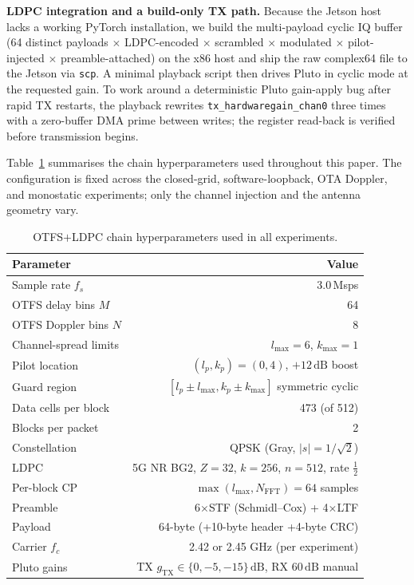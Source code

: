 \documentclass[conference,10pt]{IEEEtran}
\newcommand{\kmax}{k_{\max}}
\newcommand{\lmax}{l_{\max}}
\newcommand{\dB}{\ensuremath{\,\mathrm{dB}}}
\begin{document}
\textbf{LDPC integration and a build-only TX path.} Because the Jetson host lacks a working PyTorch installation, we build the multi-payload cyclic IQ buffer (64 distinct payloads $\times$ LDPC-encoded $\times$ scrambled $\times$ modulated $\times$ pilot-injected $\times$ preamble-attached) on the x86 host and ship the raw complex64 file to the Jetson via \texttt{scp}. A minimal playback script then drives Pluto in cyclic mode at the requested gain. To work around a deterministic Pluto gain-apply bug after rapid TX restarts, the playback rewrites \texttt{tx\_hardwaregain\_chan0} three times with a zero-buffer DMA prime between writes; the register read-back is verified before transmission begins.

Table~\ref{tab:hyperparams} summarises the chain hyperparameters used throughout this paper. The configuration is fixed across the closed-grid, software-loopback, OTA Doppler, and monostatic experiments; only the channel injection and the antenna geometry vary.

\begin{table}[!t]
  \centering
  \caption{OTFS$+$LDPC chain hyperparameters used in all experiments.}
  \label{tab:hyperparams}
  \footnotesize
  \begin{tabular}{l r}
    \toprule
    Parameter & Value \\
    \midrule
    Sample rate $f_s$       & 3.0\,Msps \\
    OTFS delay bins $M$     & 64 \\
    OTFS Doppler bins $N$   & 8 \\
    Channel-spread limits   & $\lmax{=}6$, $\kmax{=}1$ \\
    Pilot location          & $(l_p, k_p) = (0, 4)$, $+12\dB$ boost \\
    Guard region            & $[l_p \pm \lmax, k_p \pm \kmax]$ symmetric cyclic \\
    Data cells per block    & 473 (of 512) \\
    Blocks per packet       & 2 \\
    Constellation           & QPSK (Gray, $|s|=1/\sqrt{2}$) \\
    LDPC                    & 5G NR BG2, $Z{=}32$, $k{=}256$, $n{=}512$, rate $\tfrac{1}{2}$ \\
    Per-block CP            & $\max(\lmax, N_{\mathrm{FFT}}){=}64$ samples \\
    Preamble                & 6$\times$STF (Schmidl--Cox) + 4$\times$LTF \\
    Payload                 & 64-byte (+10-byte header +4-byte CRC) \\
    Carrier $f_c$           & 2.42 or 2.45 GHz (per experiment) \\
    Pluto gains             & TX $g_{\mathrm{TX}} \in \{0, -5, -15\}\dB$, RX $60\dB$ manual \\
    \bottomrule
  \end{tabular}
\end{table}
\end{document}
